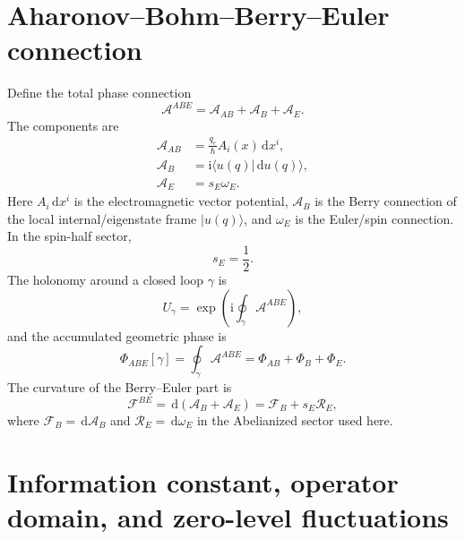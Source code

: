 \documentclass[11pt,a4paper]{article}
\newcommand{\dd}{\,\mathrm d}
\newcommand{\ii}{\mathrm i}
\newcommand{\Abe}{\mathcal A^{ABE}}
\newcommand{\Fbe}{\mathcal F^{BE}}
\begin{document}
\section{Aharonov--Bohm--Berry--Euler connection}

Define the total phase connection
\begin{equation}
\boxed{
  \Abe=\mathcal A_{AB}+\mathcal A_B+\mathcal A_E.}
  \label{eq:abe_connection}
\end{equation}
The components are
\begin{align}
  \mathcal A_{AB} &= \frac{q_e}{\hbar} A_i(x)\dd x^i,\\
  \mathcal A_B &= \ii\langle u(q)|\dd u(q)\rangle,\\
  \mathcal A_E &= s_E\omega_E.
\end{align}
Here $A_i\dd x^i$ is the electromagnetic vector potential, $\mathcal A_B$ is the Berry connection of the local internal/eigenstate frame $|u(q)\rangle$, and $\omega_E$ is the Euler/spin connection. In the spin-half sector,
\begin{equation}
  s_E=\frac12.
\end{equation}
The holonomy around a closed loop $\gamma$ is
\begin{equation}
  U_\gamma=\exp\left(\ii\oint_\gamma \Abe\right),
\end{equation}
and the accumulated geometric phase is
\begin{equation}
  \Phi_{ABE}[\gamma]
  =\oint_\gamma\Abe
  =\Phi_{AB}+\Phi_B+\Phi_E.
\end{equation}
The curvature of the Berry--Euler part is
\begin{equation}
  \Fbe=\dd(\mathcal A_B+\mathcal A_E)
  =\mathcal F_B+s_E\mathcal R_E,
\end{equation}
where $\mathcal F_B=\dd\mathcal A_B$ and $\mathcal R_E=\dd\omega_E$ in the Abelianized sector used here.

\section{Information constant, operator domain, and zero-level fluctuations}
\end{document}

